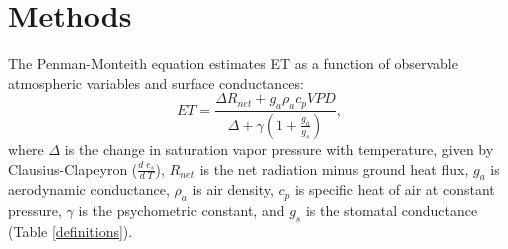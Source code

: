 \section{Methods}
\label{methods}
The Penman-Monteith equation \citep [hereafter PM,][]{Penman_1948,
  Monteith_1965} estimates ET as a function of observable atmospheric
variables and surface conductances:
  \begin{equation}
    \label{orig_pen}
    ET = \frac{\Delta R_{net} + g_a \rho_a c_p VPD}{\Delta + \gamma(1 + \frac{g_a}{g_s})},
  \end{equation}
where $\Delta$ is the change in saturation vapor pressure with
temperature, given by Clausius-Clapeyron ($\frac{d \; e_s}{d \; T}$),
$R_{net}$ is the net radiation minus ground heat flux, $g_a$ is
aerodynamic conductance, $\rho_a$ is air density, $c_p$ is specific
heat of air at constant pressure, $\gamma$ is the psychometric
constant, and $g_s$ is the stomatal conductance (Table
\ref{definitions}).

